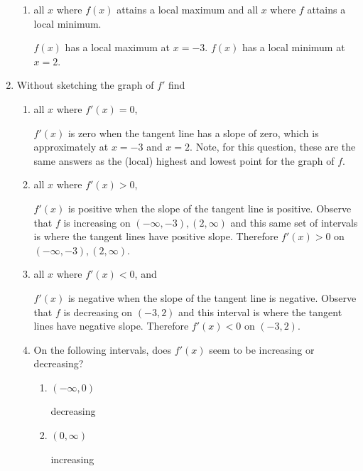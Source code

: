 \documentclass[nooutcomes]{ximera}
\begin{document}
\begin{problem}
\begin{enumerate}
\begin{enumerate}
        \item
          all $x$ where $f(x)$ attains a local maximum and all $x$ where $f$ attains a local minimum.
          \begin{freeResponse}
            $f(x)$ has a local maximum at $x=-3$.
            $f(x)$ has a local minimum at $x=2$.
          \end{freeResponse}
      \end{enumerate}
    \item

      Without sketching the graph of $f'$ find
      \begin{enumerate}
        \item 
          all $x$ where $f'(x) = 0$,
          \begin{freeResponse}
            $f'(x)$ is zero when the tangent line has a slope of zero, which is approximately at $x=-3$ and $x=2$.
            Note, for this question, these are the same answers as the (local) highest and lowest point for the graph of $f$.   
          \end{freeResponse}

        \item
          all $x$ where $f'(x) > 0$,
          \begin{freeResponse}
            ${f}'(x)$ is positive when the slope of the tangent line is positive.
            Observe that $f$ is increasing on $(-\infty ,-3), (2,\infty)$ and this same set of intervals is where the tangent lines have positive slope.
            Therefore $f'(x) > 0$ on $(-\infty ,-3), (2,\infty)$.
          \end{freeResponse}
        
        \item
          all $x$ where $f'(x) < 0$, and
          \begin{freeResponse}
            ${f}'(x)$ is negative when the slope of the tangent line is negative.
            Observe that $f$ is decreasing on $(-3,2)$ and this interval is where the tangent lines have negative slope.
            Therefore $f'(x) < 0$ on $(-3,2)$.
          \end{freeResponse}

        \item
          On the following intervals, does $f'(x)$ seem to be increasing or decreasing?
         
            \begin{enumerate}
		\item $(-\infty,0)$
			 \begin{freeResponse}
				decreasing
			  \end{freeResponse}
		\item $(0,\infty)$
			 \begin{freeResponse}
				increasing
			  \end{freeResponse}
	\end{enumerate}


\end{enumerate}
\end{enumerate}
\end{problem}
\end{document}
